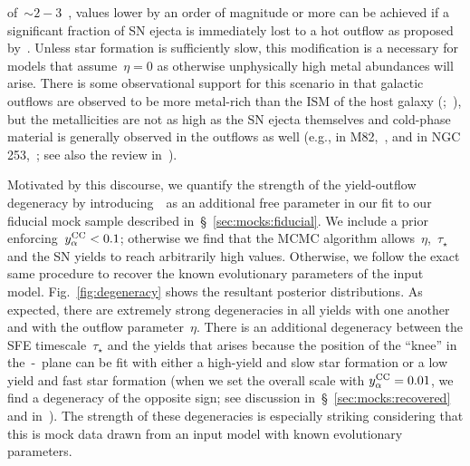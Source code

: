 \documentclass[foo.tex]{subfiles}
\begin{document}
of~$\sim2 - 3$~\citep{Griffith2021}, values lower by an order of magnitude or
more can be achieved if a significant fraction of SN ejecta is immediately
lost to a hot outflow as proposed by~\citet{Peeples2011}.
Unless star formation is sufficiently slow, this modification is a necessary
for models that assume~$\eta = 0$ as otherwise unphysically high metal
abundances will arise.
There is some observational support for this scenario in that galactic outflows
are observed to be more metal-rich than the ISM of the host galaxy
(\citealp*{Chisholm2018};~\citealp{Cameron2021}), but the metallicities are
not as high as the SN ejecta themselves and cold-phase material is generally
observed in the outflows as well (e.g., in M82,~\citealp{Lopez2020}, and in
NGC 253,~\citealp{Lopez2022}; see also the review in~\citealt{Veilleux2020}).
\par
Motivated by this discourse, we quantify the strength of the yield-outflow
degeneracy by introducing~\yacc~as an additional free parameter in our fit to
our fiducial mock sample described in~\S~\ref{sec:mocks:fiducial}.
We include a prior enforcing~$y_\alpha^\text{CC} < 0.1$; otherwise we find that the MCMC
algorithm allows~$\eta$,~$\tau_\star$ and the SN yields to reach arbitrarily
high values.
Otherwise, we follow the exact same procedure to recover the known evolutionary
parameters of the input model.
Fig.~\ref{fig:degeneracy} shows the resultant posterior distributions.
As expected, there are extremely strong degeneracies in all yields with one
another and with the outflow parameter~$\eta$.
There is an additional degeneracy between the SFE timescale~$\tau_\star$ and
the yields that arises because the position of the ``knee'' in
the~\afe-\feh~plane can be fit with either a high-yield and slow star formation
or a low yield and fast star formation (when we set the overall scale with
$y_\alpha^\text{CC} = 0.01$, we find a degeneracy of the opposite sign; see discussion
in~\S~\ref{sec:mocks:recovered} and in~\citealt{Weinberg2017}).
The strength of these degeneracies is especially striking considering that this
is mock data drawn from an input model with known evolutionary parameters.
\end{document}
